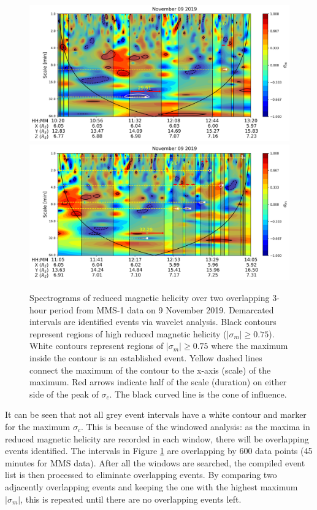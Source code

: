 \begin{figure}
    \centering
    \includegraphics[width=\textwidth]{Figures/Spectrograms/magnetichelicity_wave_events_09112019_1020.png}
    \includegraphics[width=\textwidth]{Figures/Spectrograms/magnetichelicity_wave_events_09112019_1105.png}
    \caption[Diagram of wavelet analysis identification algorithm via spectrograms of MHD quantities]{Spectrograms of reduced magnetic helicity over two overlapping 3-hour period from MMS-1 data on 9 November 2019. Demarcated intervals are identified events via wavelet analysis. Black contours represent regions of high reduced magnetic helicity ($|\sigma_m| \geq 0.75$). White contours represent regions of $|\sigma_m| \geq 0.75$ where the maximum inside the contour is an established event. Yellow dashed lines connect the maximum of the contour to the x-axis (scale) of the maximum. Red arrows indicate half of the scale (duration) on either side of the peak of $\sigma_c$. The black curved line is the cone of influence.}
    \label{fig:spectrograms-interval}
\end{figure}

It can be seen that not all grey event intervals have a white contour and marker for the maximum $\sigma_c$. This is because of the windowed analysis: as the maxima in reduced magnetic helicity are recorded in each window, there will be overlapping events identified. The intervals in Figure \ref{fig:spectrograms-interval} are overlapping by 600 data points (45 minutes for MMS data). After all the windows are searched, the compiled event list is then processed to eliminate overlapping events. By comparing two adjacently overlapping events and keeping the one with the highest maximum $|\sigma_m|$, this is repeated until there are no overlapping events left.


